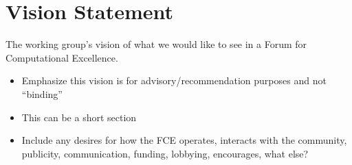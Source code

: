 \section{Vision Statement}

The working group's vision of what we would like to see in a Forum for
Computational Excellence.

\begin{itemize}
\item Emphasize this vision is for advisory/recommendation purposes and not  ``binding''
\item This can be a short section
\item Include any desires for how the FCE operates, interacts with the community, publicity, communication, funding, lobbying, encourages, what else?
\end{itemize}
